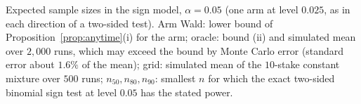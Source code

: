 \begin{table}[t]
\centering\small
\caption{Expected sample sizes in the sign model, $\alpha=0.05$ (one arm at level
$0.025$, as in each direction of a two-sided test). Arm Wald: lower bound of
Proposition~\ref{prop:anytime}(i) for the arm; oracle: bound (ii) and simulated mean over
$2{,}000$ runs, which may exceed the bound by Monte Carlo error (standard error about
$1.6\%$ of the mean); grid: simulated mean of the $10$-stake constant mixture over $500$
runs; $n_{50},n_{80},n_{90}$: smallest $n$ for which the exact two-sided binomial
sign test at level $0.05$ has the stated power.}
\label{tab:anytime}
\resizebox{\columnwidth}{!}{}
\end{table}